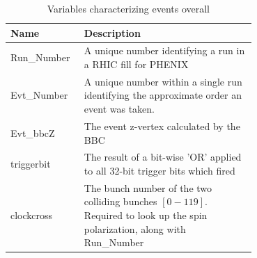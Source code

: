 \begin{table}[ht]
  \centering
  \begin{tabular}{l p{0.7\linewidth}}
    \toprule
      \textbf{Name} & \textbf{Description} \\
    \midrule
      Run\_Number & A unique number identifying a run in a RHIC fill for PHENIX \\
      Evt\_Number & A unique number within a single run identifying the approximate order an event was taken. \\
      Evt\_bbcZ & The event z-vertex calculated by the BBC \\
      triggerbit & The result of a bit-wise 'OR' applied to all 32-bit trigger bits which fired \\
    clockcross & The bunch number of the two colliding bunches $[0-119]$. Required to look up the spin polarization, along with Run\_Number \\
    \bottomrule
  \end{tabular}
  \caption{Variables characterizing events overall}
  \label{tab:evt_variables}
\end{table}

